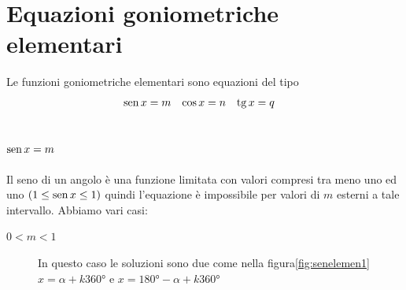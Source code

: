 %
\section{Equazioni goniometriche elementari}
\label{sec:EquazioniGoniometricheElementari}
Le funzioni goniometriche elementari sono equazioni del tipo
\begin{align*}
	\operatorname{sen} x&=m&\cos x&=n&\operatorname{tg} x&=q
\end{align*}
\subsection{$\operatorname{sen} x=m$}
Il seno di un angolo è una funzione limitata con valori compresi tra meno uno ed uno $(1\leq\operatorname{sen} x\leq 1)$ quindi l'equazione è impossibile per valori di $m$ esterni a tale intervallo. Abbiamo vari casi:
\begin{description}
	\item[$0<m<1$] In questo caso le soluzioni sono due come nella figura\nobs\vref{fig:senelemen1} $x=\alpha+k\ang{360}$ e $x=\ang{180}-\alpha+k\ang{360}$
\end{description} 

